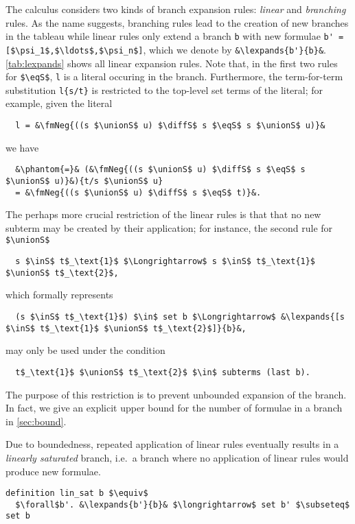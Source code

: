\documentclass[sigplan,10pt,anonymous,review]{acmart}
\newcommand{\lefttriangle}{\mathrel{\tikz[baseline]{\draw (1ex, 0.75ex) -- (0, 1.25ex) -- (0, 0.25ex) -- cycle;}}}
\newcommand{\lexpands}[2]{#1 $\lefttriangle$ #2}
\newcommand{\unionS}{\sqcup_\text{s}}
\newcommand{\diffS}{-_\text{s}}
\newcommand{\inS}{\in_\text{s}}
\newcommand{\eqS}{=_\text{s}}
\newcommand{\fmNegSymbol}{\boldsymbol{\neg}}
\newcommand{\fmNeg}[1]{$\fmNegSymbol$ #1}
\begin{document}
The calculus considers two kinds of branch expansion rules: \textit{linear} and \textit{branching} rules.
As the name suggests, branching rules lead to the creation of new branches in the tableau while linear rules only extend a branch \lstinline!b! with new formulae \lstinline[breaklines=true]!b' = [$\psi_1$,$\ldots$,$\psi_n$]!, which we denote by \lstinline!&\lexpands{b'}{b}&!.
\autoref{tab:lexpands} shows all linear expansion rules.
Note that, in the first two rules for \lstinline!$\eqS$!, \lstinline!l! is a literal occuring in the branch.
Furthermore, the term-for-term substitution \lstinline!l{s/t}! is restricted to the top-level set terms of the literal;
for example, given the literal
\begin{lstlisting}
  l = &\fmNeg{((s $\unionS$ u) $\diffS$ s $\eqS$ s $\unionS$ u)}&
\end{lstlisting}
we have
\begin{lstlisting}
  &\phantom{=}& (&\fmNeg{((s $\unionS$ u) $\diffS$ s $\eqS$ s $\unionS$ u)}&){t/s $\unionS$ u}
  = &\fmNeg{((s $\unionS$ u) $\diffS$ s $\eqS$ t)}&.
\end{lstlisting}
The perhaps more crucial restriction of the linear rules is that that no new subterm may be created by their application;
for instance, the second rule for \lstinline!$\unionS$!
\begin{lstlisting}
  s $\inS$ t$_\text{1}$ $\Longrightarrow$ s $\inS$ t$_\text{1}$ $\unionS$ t$_\text{2}$,
\end{lstlisting}
which formally represents 
\begin{lstlisting}
  (s $\inS$ t$_\text{1}$) $\in$ set b $\Longrightarrow$ &\lexpands{[s $\inS$ t$_\text{1}$ $\unionS$ t$_\text{2}$]}{b}&,
\end{lstlisting}
may only be used under the condition
\begin{lstlisting}
  t$_\text{1}$ $\unionS$ t$_\text{2}$ $\in$ subterms (last b).
\end{lstlisting}
The purpose of this restriction is to prevent unbounded expansion of the branch.
In fact, we give an explicit upper bound for the number of formulae in a branch in \autoref{sec:bound}.

Due to boundedness, repeated application of linear rules eventually results in a \textit{linearly saturated} branch, i.e.\ a branch where no application of linear rules would produce new formulae.
\begin{lstlisting}
definition lin_sat b $\equiv$
  $\forall$b'. &\lexpands{b'}{b}& $\longrightarrow$ set b' $\subseteq$ set b
\end{lstlisting}
\end{document}
